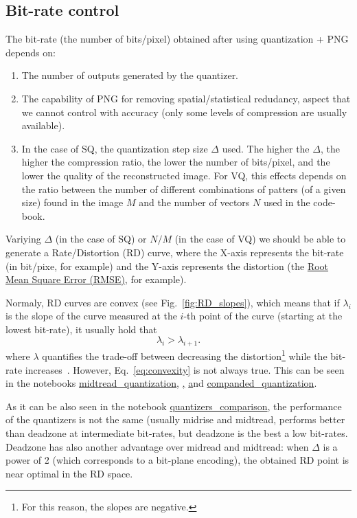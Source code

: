 
\subsection{Bit-rate control}

The bit-rate (the number of bits/pixel) obtained after using
quantization + PNG depends on:
\begin{enumerate}
\item The number of outputs generated by the quantizer.
\item The capability of PNG for removing spatial/statistical
  redudancy, aspect that we cannot control with accuracy (only some
  levels of compression are usually available).
\item In the case of SQ, the quantization step size $\Delta$ used. The
  higher the $\Delta$, the higher the compression ratio, the lower the
  number of bits/pixel, and the lower the quality of the reconstructed
  image. For VQ, this effects depends on the ratio between the number
  of different combinations of patters (of a given size) found in the
  image $M$ and the number of vectors $N$ used in the code-book.
\end{enumerate}
Variying $\Delta$ (in the case of SQ) or $N/M$ (in the case of VQ) we
should be able to generate a Rate/Distortion (RD) curve, where the
X-axis represents the bit-rate (in bit/pixe, for example) and the
Y-axis represents the distortion (the
\href{https://en.wikipedia.org/wiki/Root-mean-square_deviation}{Root
  Mean Square Error (RMSE)}, for example).

Normaly, RD curves are convex (see Fig.~\ref{fig:RD_slopes}), which
means that if $\lambda_i$ is the slope of the curve measured at the
$i$-th point of the curve (starting at the lowest bit-rate), it
usually hold that
\begin{equation}
  \lambda_i > \lambda_{i+1}.
  \label{eq:convexity}
\end{equation}
where $\lambda$ quantifies the trade-off between decreasing the
distortion\footnote{For this reason, the slopes are negative.} while
the bit-rate
increases~\cite{vetterli1995wavelets,sayood2017introduction}. However,
Eq.~\ref{eq:convexity} is not always true. This can be seen in the
notebooks \href{}{midtread\_quantization},
\href{midrise\_quantization}, \href{deadzone\_quantization} and
\href{}{companded\_quantization}.

As it can be also seen in the notebook
\href{}{quantizers\_comparison}, the performance of the quantizers is
not the same (usually midrise and midtread, performs better than
deadzone at intermediate bit-rates, but deadzone is the best a low
bit-rates. Deadzone has also another advantage over midread and
midtread: when $\Delta$ is a power of 2 (which corresponds to a
bit-plane encoding), the obtained RD point is near optimal in the RD
space.

